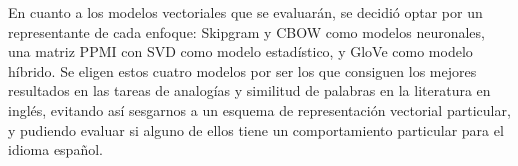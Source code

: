 En cuanto a los modelos vectoriales que se evaluarán, se decidió optar por un representante de cada
enfoque: Skipgram y CBOW como modelos neuronales, una matriz PPMI con SVD como modelo estadístico, y
GloVe como modelo híbrido. Se eligen estos cuatro modelos por ser los que consiguen los mejores
resultados en las tareas de analogías y similitud de palabras en la literatura en inglés, evitando
así sesgarnos a un esquema de representación vectorial particular, y pudiendo evaluar si alguno de
ellos tiene un comportamiento particular para el idioma español.